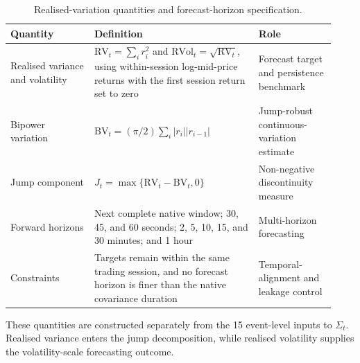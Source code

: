 
\begin{table}[!htbp]
\centering
\caption{Realised-variation quantities and forecast-horizon specification.}
\label{tab:app_forecast_targets}
\small
\begin{tabular}{@{}p{0.24\linewidth} p{0.47\linewidth} p{0.22\linewidth}@{}}
\toprule
Quantity & Definition & Role\\
\midrule
Realised variance and volatility
& \(\mathrm{RV}_t=\sum_i r_i^2\) and
\(\mathrm{RVol}_t=\sqrt{\mathrm{RV}_t}\), using within-session log-mid-price
returns with the first session return set to zero
& Forecast target and persistence benchmark\\

Bipower variation
& \(\mathrm{BV}_t=(\pi/2)\sum_i |r_i||r_{i-1}|\)
& Jump-robust continuous-variation estimate\\

Jump component
& \(J_t=\max\{\mathrm{RV}_t-\mathrm{BV}_t,0\}\)
& Non-negative discontinuity measure\\

Forward horizons
& Next complete native window; 30, 45, and 60 seconds; 2, 5, 10, 15, and
30 minutes; and 1 hour
& Multi-horizon forecasting\\

Constraints
& Targets remain within the same trading session, and no forecast horizon is
finer than the native covariance duration
& Temporal-alignment and leakage control\\
\bottomrule
\end{tabular}
\begin{minipage}{0.94\linewidth}\footnotesize
These quantities are constructed separately from the 15 event-level inputs to
\(\Sigma_t\). Realised variance enters the jump decomposition, while realised
volatility supplies the volatility-scale forecasting outcome.
\end{minipage}
\end{table}
